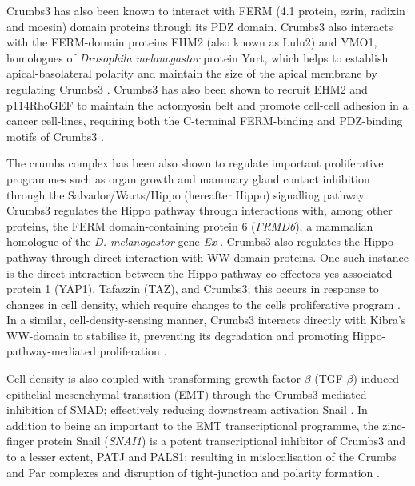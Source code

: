 
Crumbs3 has also been known to interact with FERM (4.1 protein, ezrin,
radixin and moesin) domain proteins through its PDZ domain. Crumbs3 also
interacts with the FERM-domain proteins EHM2 (also known as Lulu2) and YMO1,
homologues of {\it Drosophila melanogastor} protein Yurt, which helps to establish
apical-basolateral polarity and maintain the size of the apical membrane by
regulating Crumbs3 \citep{laprise2006}. Crumbs3 has also
been shown to recruit EHM2 and p114RhoGEF to maintain the actomyosin belt and
promote cell-cell adhesion in a cancer cell-lines, requiring both the C-terminal
FERM-binding and PDZ-binding motifs of Crumbs3 \citep{loie2015}.\par

The crumbs complex has been also shown to regulate important proliferative
programmes such as organ growth and mammary gland contact inhibition through the
Salvador/Warts/Hippo (hereafter Hippo) signalling pathway. Crumbs3 regulates the
Hippo pathway through interactions with, among other proteins, the FERM
domain-containing protein 6 ({\it FRMD6}), a mammalian homologue of the
{\it D. melanogastor} gene {\it Ex} \citep{robinson2010}. Crumbs3
also regulates the Hippo pathway through direct interaction with WW-domain proteins.
One such instance is the direct interaction between the Hippo pathway co-effectors
yes-associated protein 1 (YAP1), Tafazzin (TAZ), and Crumbs3; this occurs in
response to changes in cell density, which require changes to the cells
proliferative program \citep{varelas2010,szymaniak2015}. In a similar, cell-density-sensing
manner, Crumbs3 interacts directly with Kibra's WW-domain to stabilise it,
preventing its degradation and promoting Hippo-pathway-mediated proliferation
\citep{moleirinho2013,mao2017}.\par

Cell density is also coupled with transforming growth factor-$\beta$ (TGF-$\beta$)-induced
epithelial-mesenchymal transition (EMT) through the Crumbs3-mediated inhibition
of SMAD; effectively reducing downstream activation Snail
\citep{varelas2010}. In addition to being an important to the
EMT transcriptional programme, the zinc-finger protein Snail ({\it SNAI1}) is a potent
transcriptional inhibitor of Crumbs3 and to a lesser extent, PATJ and PALS1;
resulting in mislocalisation of the Crumbs and Par complexes and disruption of
tight-junction and polarity formation \citep{wang2013, whiteman2014}.\par

